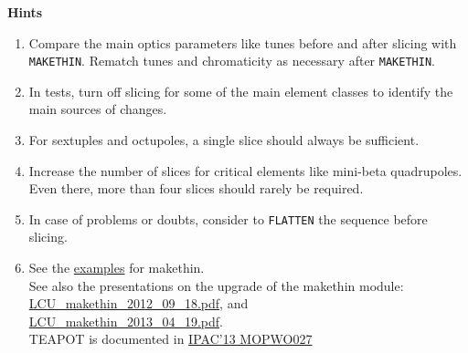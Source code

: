 {\bf Hints}
\begin{enumerate}
\item Compare the main optics parameters like tunes before and after slicing
  with \texttt{MAKETHIN}. Rematch tunes and chromaticity as necessary after
  \texttt{MAKETHIN}. 

\item In tests, turn off slicing for some of the main element classes to
  identify the main sources of changes. 

\item For sextuples and octupoles, a single slice should always be sufficient.

\item Increase the number of slices for critical elements like mini-beta
  quadrupoles. Even there, more than four slices should rarely be
  required. 

\item In case of problems or doubts, consider to
  \texttt{FLATTEN} the sequence before slicing.  

\item See the
  \href{http://madx.web.cern.ch/madx/madX/examples/makethin/}{examples}
  for makethin. \\ 
  See also the presentations on the upgrade of the makethin module:\\
  \href{http://ab-dep-abp.web.cern.ch/ab-dep-abp/LCU/LCU_meetings/2012/20120918/LCU_makethin_2012_09_18.pdf}{LCU\_makethin\_2012\_09\_18.pdf}, and \\
  \href{http://ab-dep-abp.web.cern.ch/ab-dep-abp/LCU/LCU_meetings/2013/20130419/LCU_makethin_2013_04_19.pdf}{LCU\_makethin\_2013\_04\_19.pdf}. \\ 
  TEAPOT is documented in \href{http://accelconf.web.cern.ch/AccelConf/IPAC2013/papers/mopwo027.pdf}{IPAC'13 MOPWO027}

\end{enumerate}













